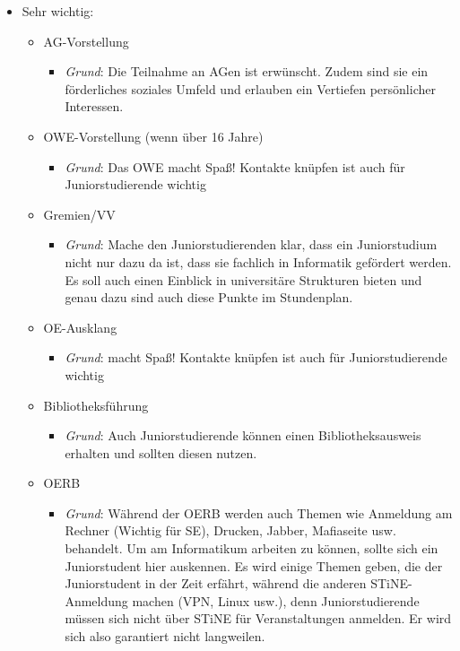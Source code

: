 \documentclass[a4paper,11pt]{scrartcl} %
\newenvironment{myitemize}{\begin{itemize}\itemsep -2pt}{\end{itemize}} %
\begin{document}
\begin{myitemize}
	\item Sehr wichtig:
		\begin{myitemize}
			\item AG-Vorstellung
				\begin{myitemize}
					\item \textit{Grund}: Die Teilnahme an AGen ist erwünscht. Zudem sind sie ein förderliches soziales Umfeld und erlauben ein Vertiefen persönlicher Interessen.
				\end{myitemize}
			\item OWE-Vorstellung (wenn über 16 Jahre)
				\begin{myitemize}
					\item \textit{Grund}: Das OWE macht Spaß! Kontakte knüpfen ist auch für Juniorstudierende wichtig
				\end{myitemize}
			\item Gremien/VV
				\begin{myitemize}
					\item \textit{Grund}: Mache den Juniorstudierenden klar, dass ein Juniorstudium nicht nur dazu da ist, dass sie fachlich in Informatik gefördert werden. Es soll auch einen Einblick in universitäre Strukturen bieten und genau dazu sind auch diese Punkte im Stundenplan.
				\end{myitemize}
			\item OE-Ausklang
				\begin{myitemize}
					\item \textit{Grund}: macht Spaß! Kontakte knüpfen ist auch für Juniorstudierende wichtig
				\end{myitemize}
			\item Bibliotheksführung
				\begin{myitemize}
					\item \textit{Grund}: Auch Juniorstudierende können einen Bibliotheksausweis erhalten und sollten diesen nutzen.
				\end{myitemize}
			\item OERB
				\begin{myitemize}
					\item \textit{Grund}: Während der OERB werden auch Themen wie Anmeldung am Rechner (Wichtig für SE), Drucken, Jabber, Mafiaseite usw. behandelt. Um am Informatikum arbeiten zu können, sollte sich ein Juniorstudent hier auskennen. Es wird einige Themen geben, die der Juniorstudent in der Zeit erfährt, während die anderen STiNE-Anmeldung machen (VPN, Linux usw.), denn Juniorstudierende müssen sich nicht über STiNE für Veranstaltungen anmelden. Er wird sich also garantiert nicht langweilen.

\end{myitemize}
\end{myitemize}
\end{myitemize}
\end{document}
